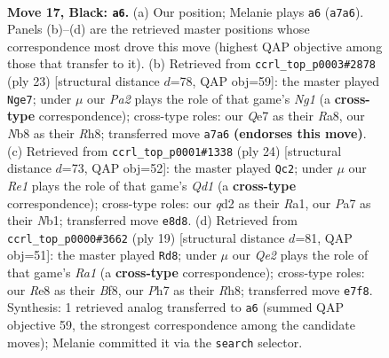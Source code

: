 \documentclass[11pt]{article}
\begin{document}
\clearpage

\begin{figure}[p]\centering
\begin{subfigure}{0.46\textwidth}\centering
\resizebox{\linewidth}{!}{%
\newchessgame
\chessboard[
  setfen={rnb1r3/p2nq1kp/1p2p1p1/2ppP3/8/2N5/PPPQ1PPP/1K2RBNR b - - 1 17},
  showmover=false,
  pgfstyle=straightmove, color=movearrow, markmove={a7-a6}
]}
\caption{}
\end{subfigure}\hfill
\begin{subfigure}{0.46\textwidth}\centering
\resizebox{\linewidth}{!}{%
\newchessgame
\chessboard[
  setfen={r3k1nr/pppq2pp/2nppb2/8/4P3/3Q1N2/PPP1NPPP/R1B2RK1 b kq - 11 12},
  showmover=false,
  pgfstyle=straightmove, color=movearrow, markmove={g8-e7}
]}
\caption{}
\end{subfigure}
\\[4pt]
\begin{subfigure}{0.46\textwidth}\centering
\resizebox{\linewidth}{!}{%
\newchessgame
\chessboard[
  setfen={r1b2rk1/1p3ppp/p1nq1n2/3p4/3P4/1PP2N2/4BPPP/RN1QR1K1 w - - 5 13},
  showmover=false,
  pgfstyle=straightmove, color=movearrow, markmove={d1-c2}
]}
\caption{}
\end{subfigure}\hfill
\begin{subfigure}{0.46\textwidth}\centering
\resizebox{\linewidth}{!}{%
\newchessgame
\chessboard[
  setfen={r3kb1r/pp1q1ppp/2nnp3/8/2P5/5N2/PP2QPPP/RNB2RK1 b kq - 0 10},
  showmover=false,
  pgfstyle=straightmove, color=movearrow, markmove={a8-d8}
]}
\caption{}
\end{subfigure}
\caption{\textbf{Move 17, Black: \texttt{a6}.} (a) Our position; Melanie plays \texttt{a6} (\texttt{a7a6}). Panels (b)--(d) are the retrieved master positions whose correspondence most drove this move (highest QAP objective among those that transfer to it). (b) Retrieved from \texttt{ccrl\_top\_p0003\#2878} (ply 23) [structural distance $d$=78, QAP obj=59]: the master played \texttt{Nge7}; under $\mu$ our \emph{Pa2} plays the role of that game's \emph{Ng1} (a \textbf{cross-type} correspondence); cross-type roles: our \emph{Q}e7 as their \emph{R}a8, our \emph{N}b8 as their \emph{R}h8; transferred move \texttt{a7a6} \textbf{(endorses this move)}. (c) Retrieved from \texttt{ccrl\_top\_p0001\#1338} (ply 24) [structural distance $d$=73, QAP obj=52]: the master played \texttt{Qc2}; under $\mu$ our \emph{Re1} plays the role of that game's \emph{Qd1} (a \textbf{cross-type} correspondence); cross-type roles: our \emph{q}d2 as their \emph{R}a1, our \emph{P}a7 as their \emph{N}b1; transferred move \texttt{e8d8}. (d) Retrieved from \texttt{ccrl\_top\_p0000\#3662} (ply 19) [structural distance $d$=81, QAP obj=51]: the master played \texttt{Rd8}; under $\mu$ our \emph{Qe2} plays the role of that game's \emph{Ra1} (a \textbf{cross-type} correspondence); cross-type roles: our \emph{R}e8 as their \emph{B}f8, our \emph{P}h7 as their \emph{R}h8; transferred move \texttt{e7f8}. Synthesis: 1 retrieved analog transferred to \texttt{a6} (summed QAP objective 59, the strongest correspondence among the candidate moves); Melanie committed it via the \texttt{search} selector.}
\label{fig:thought-m33}
\end{figure}
\end{document}
